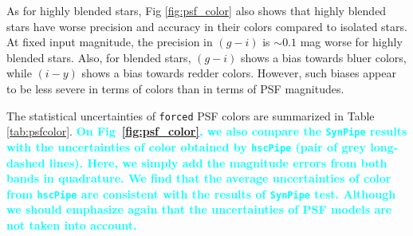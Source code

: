 \documentclass[useamsfonts]{pasj01}
\def\hscpipe{\texttt{hscPipe}}
\def\synpipe{\texttt{SynPipe}}
\def\forced{\texttt{forced}}
\newcommand{\song}[1]{\textcolor{cyan} {\textbf{#1}}}
\begin{document}
    As for highly blended stars, Fig \ref{fig:psf_color} also shows that highly blended 
    stars have worse precision and accuracy in their colors compared to isolated stars. 
    At fixed input magnitude, the precision in $(g-i)$ is ${\sim}0.1$ mag worse for 
    highly blended stars.  
    Also, for blended stars, $(g-i)$ shows a bias towards bluer colors, while $(i-y)$ 
    shows a bias towards redder colors. 
    However, such biases appear to be less severe in terms of colors than in terms of
    PSF magnitudes.
    
	The statistical uncertainties of \forced{} PSF colors are summarized in 
	Table \ref{tab:psfcolor}. 
	\song{
	On Fig~\ref{fig:psf_color}, we also compare the \synpipe{} results with the 
	uncertainties of \psf{} color obtained by \hscpipe{} (pair of grey long-dashed 
	lines). 
	Here, we simply add the magnitude errors from both bands in quadrature. 
	We find that the average uncertainties of \psf{} color from \hscpipe{} are 
	consistent with the results of \synpipe{} test. 
	Although we should emphasize again that the uncertainties of PSF models are not 
	taken into account. 
    }
    
\end{document}
